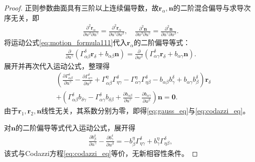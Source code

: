 \documentclass[../../main.tex]{subfiles}%
\begin{document}
\begin{proof}

正则参数曲面具有三阶以上连续偏导数，故$\boldsymbol{r}_\alpha,\boldsymbol{n}$的二阶混合偏导与求导次序无关，即
\begin{align*}
\frac{\partial^2 \boldsymbol{r}_\alpha}{\partial u^\beta\partial u^\gamma} = \frac{\partial^2 \boldsymbol{r}_\alpha}{\partial u^\gamma\partial u^\beta},\quad \frac{\partial^2 \boldsymbol{n}}{\partial u^\beta\partial u^\gamma} = \frac{\partial^2 \boldsymbol{n}}{\partial u^\gamma\partial u^\beta}.
\end{align*}
将运动公式\eqref{eq:motion_formula111}代入$\boldsymbol{r}_\alpha$的二阶偏导等式：
\begin{align*}
\frac{\partial}{\partial u^\gamma}\left(\Gamma^\delta_{\alpha\beta}\boldsymbol{r}_\delta + b_{\alpha\beta}\boldsymbol{n}\right) = \frac{\partial}{\partial u^\beta}\left(\Gamma^\delta_{\alpha\gamma}\boldsymbol{r}_\delta + b_{\alpha\gamma}\boldsymbol{n}\right).
\end{align*}
展开并再次代入运动公式，整理得
\begin{align*}
&\left(\frac{\partial \Gamma^\delta_{\alpha\beta}}{\partial u^\gamma}-\frac{\partial \Gamma^\delta_{\alpha\gamma}}{\partial u^\beta}+\Gamma^\eta_{\alpha\beta}\Gamma^\delta_{\eta\gamma}-\Gamma^\eta_{\alpha\gamma}\Gamma^\delta_{\eta\beta}-b_{\alpha\beta}b^\delta_\gamma + b_{\alpha\gamma}b^\delta_\beta\right)\boldsymbol{r}_\delta\\
&+\left(\Gamma^\delta_{\alpha\beta}b_{\delta\gamma}-\Gamma^\delta_{\alpha\gamma}b_{\delta\beta}+\frac{\partial b_{\alpha\beta}}{\partial u^\gamma}-\frac{\partial b_{\alpha\gamma}}{\partial u^\beta}\right)\boldsymbol{n} = \boldsymbol{0}.
\end{align*}
由于$\boldsymbol{r}_1,\boldsymbol{r}_2,\boldsymbol{n}$线性无关，其系数分别为零，即得\eqref{eq:gauss_eq}与\eqref{eq:codazzi_eq}。

对$\boldsymbol{n}$的二阶偏导等式代入运动公式，展开得
\begin{align*}
\frac{\partial b^\delta_\beta}{\partial u^\gamma}-\frac{\partial b^\delta_\gamma}{\partial u^\beta} = -b^\eta_\beta\Gamma^\delta_{\eta\gamma}+b^\eta_\gamma\Gamma^\delta_{\eta\beta},
\end{align*}
该式与Codazzi方程\eqref{eq:codazzi_eq}等价，无新相容性条件。

\end{proof}
\end{document}
